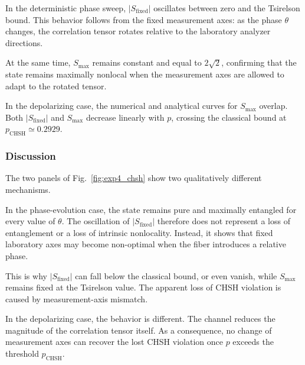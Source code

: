 \documentclass[a4paper]{article}
\begin{document}
\medskip

In the deterministic phase sweep, \( |S_{\mathrm{fixed}}| \) oscillates between zero and the Tsirelson bound. This behavior follows from the fixed measurement axes: as the phase \( \theta \) changes, the correlation tensor rotates relative to the laboratory analyzer directions.

\medskip

At the same time, \( S_{\max} \) remains constant and equal to \( 2\sqrt{2} \), confirming that the state remains maximally nonlocal when the measurement axes are allowed to adapt to the rotated tensor.

\medskip

In the depolarizing case, the numerical and analytical curves for \( S_{\max} \) overlap. Both \( |S_{\mathrm{fixed}}| \) and \( S_{\max} \) decrease linearly with \( p \), crossing the classical bound at \( p_{\mathrm{CHSH}} \simeq 0.2929 \).

\medskip


\subsubsection{Discussion}

The two panels of Fig.~\ref{fig:exp4_chsh} show two qualitatively different mechanisms.

\medskip

In the phase-evolution case, the state remains pure and maximally entangled for every value of \( \theta \). The oscillation of \( |S_{\mathrm{fixed}}| \) therefore does not represent a loss of entanglement or a loss of intrinsic nonlocality. Instead, it shows that fixed laboratory axes may become non-optimal when the fiber introduces a relative phase.

\medskip

This is why \( |S_{\mathrm{fixed}}| \) can fall below the classical bound, or even vanish, while \( S_{\max} \) remains fixed at the Tsirelson value. The apparent loss of CHSH violation is caused by measurement-axis mismatch.

\medskip

In the depolarizing case, the behavior is different. The channel reduces the magnitude of the correlation tensor itself. As a consequence, no change of measurement axes can recover the lost CHSH violation once \( p \) exceeds the threshold \( p_{\mathrm{CHSH}} \).
\end{document}

